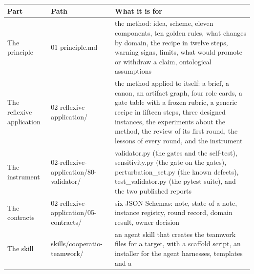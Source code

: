 \documentclass[
  american,
  10pt,
]{report}
\newcounter{none} %
\renewcommand{\texttt}[1]{{\ttfamily\hyphenchar\font=-1 #1}}
\begin{document}
{\def\LTcaptype{none} %
\begin{longtable}[]{@{}
  >{\raggedright\arraybackslash}p{}
  >{\raggedright\arraybackslash}p{}
  >{\raggedright\arraybackslash}p{}@{}}
\toprule\noalign{}
\begin{minipage}[b]{\linewidth}\raggedright
Part
\end{minipage} & \begin{minipage}[b]{\linewidth}\raggedright
Path
\end{minipage} & \begin{minipage}[b]{\linewidth}\raggedright
What it is for
\end{minipage} \\
\midrule\noalign{}
\endhead
\bottomrule\noalign{}
\endlastfoot
The principle & \texttt{01-\allowbreak{}principle.\allowbreak{}md} & the
method: idea, scheme, eleven components, ten golden rules, what changes
by domain, the recipe in twelve steps, warning signs, limits, what would
promote or withdraw a claim, ontological assumptions \\
The reflexive application &
\texttt{02-\allowbreak{}reflexive-\allowbreak{}application/\allowbreak{}}
& the method applied to itself: a brief, a canon, an artifact graph,
four role cards, a gate table with a frozen rubric, a generic recipe in
fifteen steps, three designed instances, the experiments about the
method, the review of its first round, the lessons of every round, and
the instrument \\
The instrument &
\texttt{02-\allowbreak{}reflexive-\allowbreak{}application/\allowbreak{}80-\allowbreak{}validator/\allowbreak{}}
& \texttt{validator.\allowbreak{}py} (the gates and the self-test),
\texttt{sensitivity.\allowbreak{}py} (the gate on the gates),
\texttt{perturbation\_\allowbreak{}set.\allowbreak{}py} (the known
defects), \texttt{test\_\allowbreak{}validator.\allowbreak{}py} (the
pytest suite), and the two published reports \\
The contracts &
\texttt{02-\allowbreak{}reflexive-\allowbreak{}application/\allowbreak{}05-\allowbreak{}contracts/\allowbreak{}}
& six JSON Schemas: note, state of a note, instance registry, round
record, domain result, owner decision \\
The skill &
\texttt{skills/\allowbreak{}cooperatio-\allowbreak{}teamwork/\allowbreak{}}
& an agent skill that creates the teamwork files for a target, with a
scaffold script, an installer for the agent harnesses, templates and a

\end{longtable}}
\end{document}
